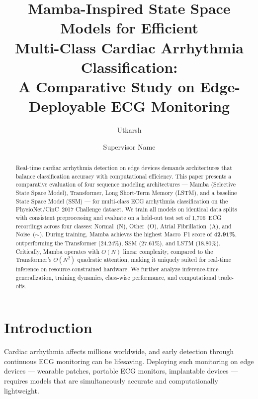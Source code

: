 \documentclass[runningheads]{llncs}
\begin{document}
\title{Mamba-Inspired State Space Models for Efficient\\Multi-Class Cardiac Arrhythmia Classification:\\A Comparative Study on Edge-Deployable ECG Monitoring}

\author{Utkarsh \and Supervisor Name}

\maketitle

\begin{abstract}
Real-time cardiac arrhythmia detection on edge devices demands architectures
that balance classification accuracy with computational efficiency. This paper
presents a comparative evaluation of four sequence modeling architectures ---
Mamba (Selective State Space Model), Transformer, Long Short-Term Memory (LSTM),
and a baseline State Space Model (SSM) --- for multi-class ECG arrhythmia
classification on the PhysioNet/CinC~2017 Challenge dataset. We train all
models on identical data splits with consistent preprocessing and evaluate on a
held-out test set of 1,706~ECG recordings across four classes: Normal~(N),
Other~(O), Atrial Fibrillation~(A), and Noise~($\sim$). During training, Mamba
achieves the highest Macro~F1 score of \textbf{42.91\%}, outperforming the
Transformer (24.24\%), SSM (27.61\%), and LSTM (18.80\%). Critically, Mamba
operates with $O(N)$ linear complexity, compared to the Transformer's $O(N^2)$
quadratic attention, making it uniquely suited for real-time inference on
resource-constrained hardware. We further analyze inference-time
generalization, training dynamics, class-wise performance, and computational
trade-offs.
\end{abstract}


\section{Introduction}
\label{sec:intro}

Cardiac arrhythmia affects millions worldwide, and early detection through
continuous ECG monitoring can be lifesaving. Deploying such monitoring on edge
devices --- wearable patches, portable ECG monitors, implantable devices ---
requires models that are simultaneously accurate and computationally
lightweight.
\end{document}
